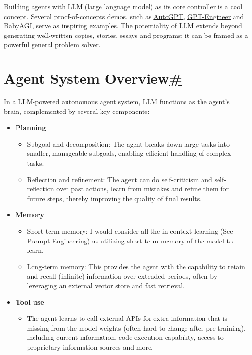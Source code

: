 Building agents with LLM (large language model) as its core controller is a cool concept. Several proof-of-concepts demos, such as \href{https://github.com/Significant-Gravitas/Auto-GPT}{AutoGPT}, \href{https://github.com/AntonOsika/gpt-engineer}{GPT-Engineer} and \href{https://github.com/yoheinakajima/babyagi}{BabyAGI}, serve as inspiring examples. The potentiality of LLM extends beyond generating well-written copies, stories, essays and programs; it can be framed as a powerful general problem solver.

\section{\texorpdfstring{Agent System Overview\hyperref[agent-system-overview]{\#}}{Agent System Overview\#}}\label{agent-system-overview}

In a LLM-powered autonomous agent system, LLM functions as the agent's brain, complemented by several key components:

\begin{itemize}
\tightlist
\item
  \textbf{Planning}

  \begin{itemize}
  \tightlist
  \item
    Subgoal and decomposition: The agent breaks down large tasks into smaller, manageable subgoals, enabling efficient handling of complex tasks.
  \item
    Reflection and refinement: The agent can do self-criticism and self-reflection over past actions, learn from mistakes and refine them for future steps, thereby improving the quality of final results.
  \end{itemize}
\item
  \textbf{Memory}

  \begin{itemize}
  \tightlist
  \item
    Short-term memory: I would consider all the in-context learning (See \href{https://lilianweng.github.io/posts/2023-03-15-prompt-engineering/}{Prompt Engineering}) as utilizing short-term memory of the model to learn.
  \item
    Long-term memory: This provides the agent with the capability to retain and recall (infinite) information over extended periods, often by leveraging an external vector store and fast retrieval.
  \end{itemize}
\item
  \textbf{Tool use}

  \begin{itemize}
  \tightlist
  \item
    The agent learns to call external APIs for extra information that is missing from the model weights (often hard to change after pre-training), including current information, code execution capability, access to proprietary information sources and more.
  \end{itemize}
\end{itemize}

